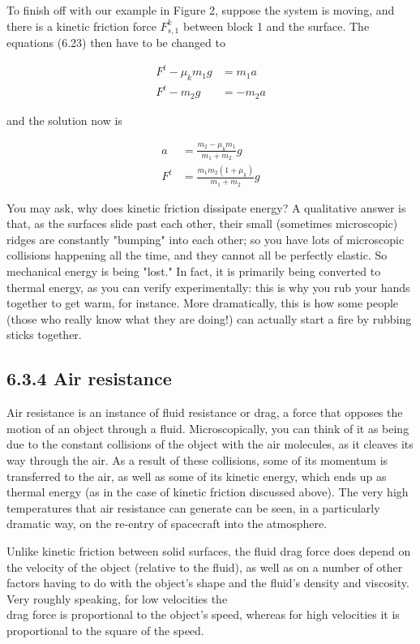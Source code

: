 \documentclass[10pt]{article}
\begin{document}
To finish off with our example in Figure 2, suppose the system is moving, and there is a kinetic friction force $F_{s, 1}^{k}$ between block 1 and the surface. The equations (6.23) then have to be changed to


\begin{align*}
F^{t}-\mu_{k} m_{1} g & =m_{1} a \\
F^{t}-m_{2} g & =-m_{2} a \tag{6.31}
\end{align*}


and the solution now is


\begin{align*}
a & =\frac{m_{2}-\mu_{k} m_{1}}{m_{1}+m_{2}} g \\
F^{t} & =\frac{m_{1} m_{2}\left(1+\mu_{k}\right)}{m_{1}+m_{2}} g \tag{6.32}
\end{align*}


You may ask, why does kinetic friction dissipate energy? A qualitative answer is that, as the surfaces slide past each other, their small (sometimes microscopic) ridges are constantly "bumping" into each other; so you have lots of microscopic collisions happening all the time, and they cannot all be perfectly elastic. So mechanical energy is being "lost." In fact, it is primarily being converted to thermal energy, as you can verify experimentally: this is why you rub your hands together to get warm, for instance. More dramatically, this is how some people (those who really know what they are doing!) can actually start a fire by rubbing sticks together.

\subsection*{6.3.4 Air resistance}
Air resistance is an instance of fluid resistance or drag, a force that opposes the motion of an object through a fluid. Microscopically, you can think of it as being due to the constant collisions of the object with the air molecules, as it cleaves its way through the air. As a result of these collisions, some of its momentum is transferred to the air, as well as some of its kinetic energy, which ends up as thermal energy (as in the case of kinetic friction discussed above). The very high temperatures that air resistance can generate can be seen, in a particularly dramatic way, on the re-entry of spacecraft into the atmosphere.

Unlike kinetic friction between solid surfaces, the fluid drag force does depend on the velocity of the object (relative to the fluid), as well as on a number of other factors having to do with the object's shape and the fluid's density and viscosity. Very roughly speaking, for low velocities the\\
drag force is proportional to the object's speed, whereas for high velocities it is proportional to the square of the speed.
\end{document}

